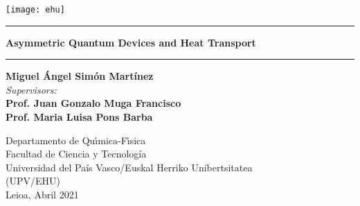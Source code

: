 \begin{titlepage}
\thispagestyle{empty} %
\hspace{-0.3cm}\texttt{[image: ehu]}\hspace{0.3cm}
\bigskip
{\centering \large
\par \vspace{1cm}

\hrule\vspace*{0.5cm}

{\LARGE \bf {Asymmetric Quantum Devices and Heat Transport}}

\vspace{0.7cm}\hrule \vspace{2.75cm}
{\LARGE \bf{Miguel \'{A}ngel Sim\'{o}n Mart\'{i}nez}}\\
\vspace{1.25cm}
{\it{Supervisors:}} \\
\vspace{0.1cm}
{\large \bf {Prof. Juan Gonzalo Muga Francisco}}\\
{\large \bf {Prof. Maria Luisa Pons Barba}}\\
\vspace{2.2cm}
\begin{figure}[h]
{\centering {

}\par}
\end{figure}
\vspace{1.0cm}
Departamento de Qu\'{\i}mica-F\'{\i}sica\\
Facultad de Ciencia y Tecnolog\'ia\\
Universidad del Pa\'is Vasco/Euskal Herriko Unibertsitatea\\ (UPV/EHU)\\
\vspace*{1.0cm}
\hspace{5.5cm}Leioa, Abril 2021} \pagebreak
\end{titlepage}
